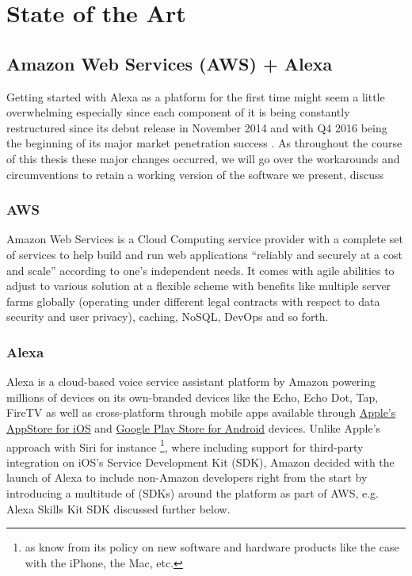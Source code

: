 \section{State of the Art}


\subsection*{Amazon Web Services (AWS) + Alexa}


Getting started with Alexa as a platform for the first time might seem a little overwhelming especially since each component of it is being  constantly restructured since its debut release in November 2014 and with Q4 2016 being the beginning of its major market penetration success \cite{gartnerpreds17}. %
As throughout the course of this thesis these major changes occurred, %
 we will go over the workarounds and circumventions to retain a working version of the software we present, discuss


\subsubsection*{AWS}
Amazon Web Services is a Cloud Computing service provider with a complete set of services to help build and run web applications ``reliably and securely at a cost and scale'' according to one's independent needs. \cite{aws_website}
It comes with agile abilities to adjust to various solution at a flexible scheme with benefits like multiple server farms globally (operating under different legal contracts with respect to data security and user privacy), caching, NoSQL, DevOps and so forth.


\subsubsection*{Alexa}
Alexa is a cloud-based voice service assistant platform by Amazon powering millions of devices  on its own-branded devices like the Echo, Echo Dot, Tap, FireTV as well as cross-platform through mobile apps available through  \href{https://itunes.apple.com/de/app/amazon-alexa/id944011620?l=en&mt=8}{Apple's AppStore for iOS} and  \href{https://play.google.com/store/apps/details?id=com.amazon.dee.app&hl=en}{Google Play Store for Android} devices. Unlike Apple's approach with Siri for instance \footnote{as know from its policy on  new software and hardware products like the case with the iPhone, the Mac, etc.}, where including support for third-party integration on iOS's Service Development Kit (SDK), Amazon decided with the launch of Alexa to include non-Amazon developers right from the start by introducing a multitude of (SDKs) around the platform as part of AWS, e.g. Alexa Skills Kit SDK discussed further below.

